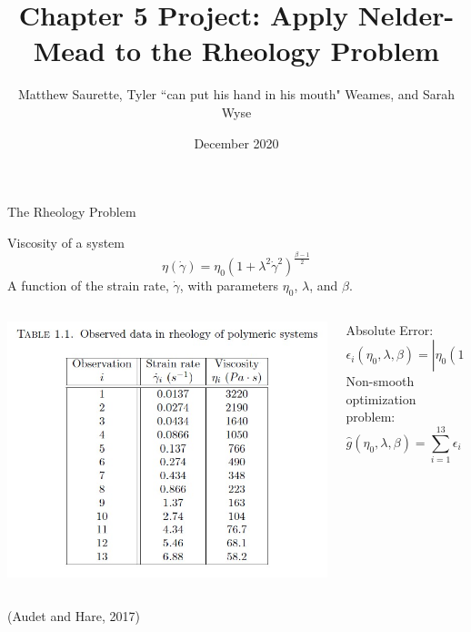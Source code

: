 \documentclass{beamer}
\title[Nelder-Mead on the Rheology Problem]{Chapter 5 Project: Apply Nelder-Mead to the Rheology Problem}
\author[Matthew, Tyler, and Sarah]{Matthew Saurette, Tyler ``can put his hand in his mouth" Weames, and Sarah Wyse}
\institute[Math 462]{Math 462\\ University of British Columbia - Okanagan}
\date{December 2020}
\begin{document}
\maketitle


\begin{frame}{The Rheology Problem}
\begin{block}{Viscosity of a system}
$$\eta(\dot{\gamma}) = \eta_0(1+\lambda^2\dot{\gamma}^2)^{\frac{\beta -1}{2}}$$
A function of the strain rate, $\dot{\gamma}$, with parameters $\eta_0$, $\lambda$, and $\beta$.
\end{block}
\begin{columns}
	\begin{column}{0.45\linewidth}
		\centering
		\includegraphics[width=0.95\linewidth]{Data}
	\end{column}
	\begin{column}{0.53\linewidth}
		Absolute Error:
		$$\epsilon_i(\eta_0, \lambda, \beta) = |\eta_0(1+\lambda^2\dot{\gamma}^2)^{\frac{\beta -1}{2}} - \eta_i|$$
		Non-smooth optimization problem:
		$$\hat{g}(\eta_0, \lambda, \beta) = \sum\limits_{i=1}^{13}\epsilon_i(\eta_0, \lambda, \beta)$$
	\end{column}
\end{columns}
\hfill \tiny (Audet and Hare, 2017)
\end{frame}
\end{document}
